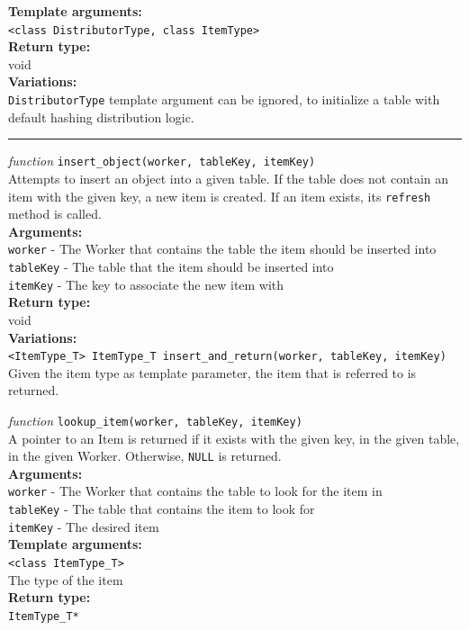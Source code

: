 \documentclass{uit-report}
\begin{document}
\textbf{Template arguments:}\\
\phantom{11111} \texttt{<class DistributorType, class ItemType>}\\
\textbf{Return type:}\\
\phantom{11111}  void\\
\textbf{Variations:}\\
\phantom{11111} \texttt{DistributorType} template argument can be ignored, to initialize a table with default hashing distribution logic.

\vskip 0.05cm
\begin{center}
	\noindent\rule{4cm}{1.2pt}
\end{center}
\vskip 0.15cm
\textit{function} \texttt{insert\_object(worker, tableKey, itemKey)}\\
\phantom{11111} Attempts to insert an object into a given table. If the table does not contain an item with the given key, a new item is created. If an item exists, its \texttt{refresh} method is called.  \\
\textbf{Arguments:}\\
\phantom{11111} \texttt{worker} - The Worker that contains the table the item should be inserted into\\
\phantom{11111} \texttt{tableKey} - The table that the item should be inserted into\\
\phantom{11111} \texttt{itemKey} - The key to associate the new item with\\
\textbf{Return type:}\\
\phantom{11111}  void\\
\textbf{Variations:}\\
\phantom{11111} \texttt{<ItemType\_T> ItemType\_T insert\_and\_return(worker, tableKey, itemKey)}\\
\phantom{11111}\phantom{11111} Given the item type as template parameter, the item that is referred to is returned.
\newpage

\textit{function} \texttt{lookup\_item(worker, tableKey, itemKey)}\\
\phantom{11111} A pointer to an Item is returned if it exists with the given key, in the given table, in the given Worker. Otherwise, \texttt{NULL} is returned.\\
\textbf{Arguments:}\\
\phantom{11111} \texttt{worker} - The Worker that contains the table to look for the item in\\
\phantom{11111} \texttt{tableKey} - The table that contains the item to look for\\
\phantom{11111} \texttt{itemKey} - The desired item\\
\textbf{Template arguments:}\\
\phantom{11111} \texttt{<class ItemType\_T>}\\
\phantom{11111}\phantom{11111} The type of the item\\
\textbf{Return type:}\\
\phantom{11111}  \texttt{ItemType\_T*}
\end{document}
